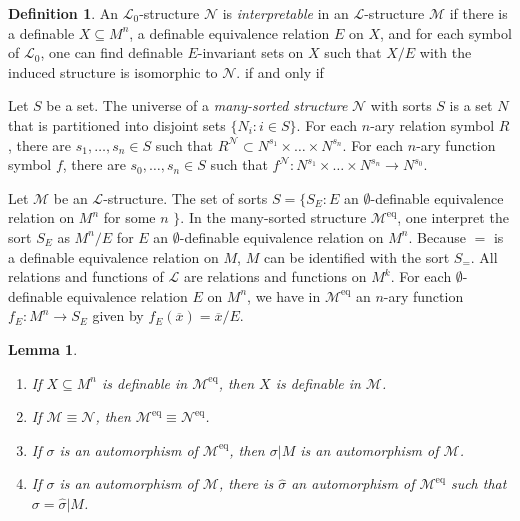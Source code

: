 \documentclass{amsart}
\newtheorem{lemma}[theorem]{Lemma}
\theoremstyle{definition}
\newtheorem{definition}[theorem]{Definition}
\numberwithin{equation}{section}
\begin{document}
\begin{definition}
    An $\mathcal{L}_0$-structure $\mathcal{N}$ is \emph{interpretable} in an $\mathcal{L}$-structure $\mathcal{M}$ if there is a definable $X \subseteq M^n$, a definable equivalence relation $E$ on $X$,
    and for each symbol of $\mathcal{L}_0$, one can find definable $E$-invariant sets on $X$ such that $X / E$ with the induced structure is isomorphic to $\mathcal{N}$.
if and only if 
\end{definition}

Let $S$ be a set.
The universe of a \emph{many-sorted structure} $\mathcal{N}$ with sorts $S$ is 
a set $N$ that is partitioned into disjoint sets $\{N_i : i \in S\}$.
For each $n$-ary relation symbol $R$,
there are $s_1,\dots,s_n \in S$ such that $R^{\mathcal{N}} \subset N^{s_1} \times \dots \times N^{s_n}$.
For each $n$-ary function symbol $f$,
there are $s_0,\dots,s_n \in S$ such that $f^{\mathcal{N}} : N^{s_1} \times \dots \times N^{s_n} \to N^{s_0}$.

Let $\mathcal{M}$ be an $\mathcal{L}$-structure.
The set of sorts $S = \{S_E : E$ an $\emptyset$-definable equivalence relation on $M^n$ for some $n$ $\}$.
In the many-sorted structure $\mathcal{M}^{\mathrm{eq}}$,
one interpret the sort $S_E$ as $M^n / E$ for $E$ an $\emptyset$-definable equivalence relation on $M^n$.
Because $=$ is a definable equivalence relation on $M$,
$M$ can be identified with the sort $S_{=}$.
All relations and functions of $\mathcal{L}$ are relations and functions on $M^k$.
For each $\emptyset$-definable equivalence relation $E$ on $M^n$,
we have in $\mathcal{M}^{\mathrm{eq}}$ an $n$-ary function $f_E: M^n \to S_E$ given by $f_E(\overline{x}) = \overline{x} / E$.

\begin{lemma}
    \begin{enumerate}[label = {\roman*)}]
        \item If $X \subseteq M^n$ is definable in $\mathcal{M}^{\mathrm{eq}}$, then $X$ is definable in $\mathcal{M}$.
        \item If $\mathcal{M} \equiv \mathcal{N}$, then $\mathcal{M}^{\mathrm{eq}} \equiv \mathcal{N}^{\mathrm{eq}}$.
        \item If $\sigma$ is an automorphism of $\mathcal{M}^{\mathrm{eq}}$, then $\sigma|M$ is an automorphism of $\mathcal{M}$.
        \item If $\sigma$ is an automorphism of $\mathcal{M}$, there is $\widehat{\sigma}$ an automorphism of $\mathcal{M}^{\mathrm{eq}}$ such that $\sigma = \widehat{\sigma}|M$.
    \end{enumerate}
\end{lemma}
\end{document}
